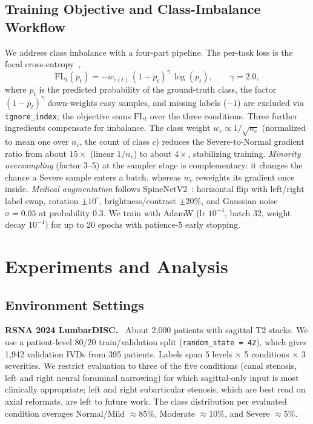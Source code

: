 \documentclass[runningheads]{llncs}
\begin{document}
\subsection{Training Objective and Class-Imbalance Workflow}\label{sec:objective}

We address class imbalance with a four-part pipeline. The per-task loss is the focal cross-entropy~\cite{lin2017focal},
\begin{equation}
\mathrm{FL}_t(p_t) = -w_{c(t)}\,(1 - p_t)^{\gamma}\, \log(p_t),
\qquad \gamma = 2.0,
\label{eq:focal}
\end{equation}
where $p_t$ is the predicted probability of the ground-truth class, the factor $(1 - p_t)^{\gamma}$ down-weights easy samples, and missing labels ($-1$) are excluded via \verb|ignore_index|; the objective sums $\mathrm{FL}_t$ over the three conditions. Three further ingredients compensate for imbalance. The class weight $w_c \propto 1/\sqrt{n_c}$ (normalized to mean one over $n_c$, the count of class $c$) reduces the Severe-to-Normal gradient ratio from about $15\times$ (linear $1/n_c$) to about $4\times$, stabilizing training. \emph{Minority oversampling} (factor 3--5) at the sampler stage is complementary: it changes the chance a Severe sample enters a batch, whereas $w_c$ reweights its gradient once inside. \emph{Medical augmentation} follows SpineNetV2~\cite{windsor2022}: horizontal flip with left/right label swap, rotation $\pm 10^{\circ}$, brightness/contrast $\pm 20\%$, and Gaussian noise $\sigma = 0.05$ at probability $0.3$. We train with AdamW (lr $10^{-4}$, batch 32, weight decay $10^{-4}$) for up to 20 epochs with patience-5 early stopping.

\section{Experiments and Analysis}\label{sec4}

\subsection{Environment Settings}\label{exp1}

\textbf{RSNA 2024 LumbarDISC.}~\cite{kaggle2024} About 2{,}000 patients with sagittal T2 stacks. We use a patient-level 80/20 train/validation split (\verb|random_state = 42|), which gives 1{,}942 validation IVDs from 395 patients. Labels span 5 levels $\times$ 5 conditions $\times$ 3 severities. We restrict evaluation to three of the five conditions (canal stenosis, left and right neural foraminal narrowing) for which sagittal-only input is most clinically appropriate; left and right subarticular stenosis, which are best read on axial reformats, are left to future work. The class distribution per evaluated condition averages Normal/Mild $\approx 85\%$, Moderate $\approx 10\%$, and Severe $\approx 5\%$.
\end{document}
